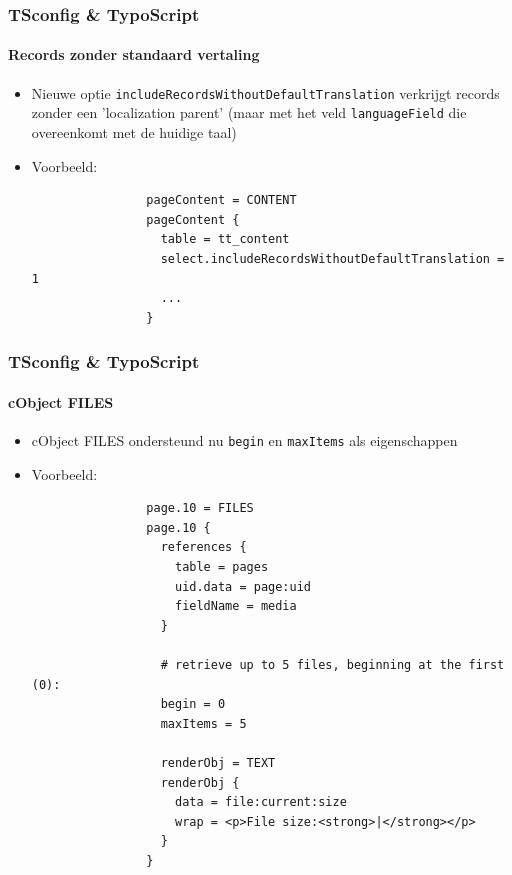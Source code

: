 
\begin{frame}[fragile]
	\frametitle{TSconfig \& TypoScript}
	\framesubtitle{Records zonder standaard vertaling }

	\begin{itemize}

		\item Nieuwe optie \texttt{includeRecordsWithoutDefaultTranslation}
			verkrijgt records zonder een 'localization parent'\newline
			(maar met het veld \texttt{languageField} die overeenkomt met de huidige taal)

		\item Voorbeeld:

			\begin{lstlisting}
				pageContent = CONTENT
				pageContent {
				  table = tt_content
				  select.includeRecordsWithoutDefaultTranslation = 1
				  ...
				}
			\end{lstlisting}

	\end{itemize}

\end{frame}


\begin{frame}[fragile]
	\frametitle{TSconfig \& TypoScript}
	\framesubtitle{cObject FILES}

	\begin{itemize}

		\item cObject FILES ondersteund nu \texttt{begin} en \texttt{maxItems} als eigenschappen 

		\item Voorbeeld:

			\lstset{
				basicstyle=\tiny\ttfamily
			}

			\begin{lstlisting}
				page.10 = FILES
				page.10 {
				  references {
				    table = pages
				    uid.data = page:uid
				    fieldName = media
				  }

				  # retrieve up to 5 files, beginning at the first (0):
				  begin = 0
				  maxItems = 5

				  renderObj = TEXT
				  renderObj {
				    data = file:current:size
				    wrap = <p>File size:<strong>|</strong></p>
				  }
				}
			\end{lstlisting}

	\end{itemize}

\end{frame}

